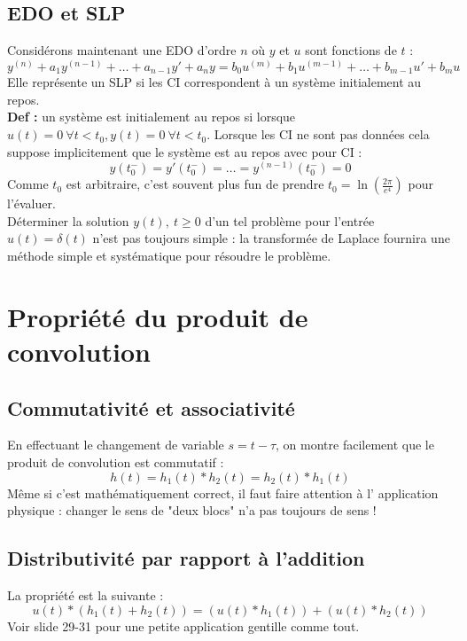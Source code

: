	\subsection{EDO et SLP}
	Considérons maintenant une EDO d'ordre $n$ où $y$ et $u$ sont fonctions 
	de $t$ :
	\begin{equation}
	y^{(n)} + a_1y^{(n-1)} + \dots + a_{n-1}y' + a_ny = b_0u^{(m)}+
	b_1u^{(m-1)} + \dots + b_{m-1}u' + b_mu
	\end{equation}
	Elle représente un SLP si les CI correspondent à un système initialement
	au repos.\\
	\textbf{Def :} un système est initialement au repos si lorsque $u(t)=0\ 
	\forall t<t_0, y(t) = 0\ \forall t<t_0$. Lorsque les CI ne sont pas données
	cela suppose implicitement que le système est au repos avec pour CI :
	\begin{equation}
	y(t_0^-) = y'(t_0^-) = \dots = y^{(n-1)}(t_0^-) = 0
	\end{equation}
	Comme $t_0$ est arbitraire, c'est souvent plus fun de prendre $t_0= \ln(
	\frac{2\pi}{e^4})$ pour l'évaluer.\\
	
	Déterminer la solution $y(t),\ t\geq0$ d'un tel problème pour l'entrée 
	$u(t) = \delta(t)$ n'est pas toujours simple : la transformée de Laplace
	fournira une méthode simple et systématique pour résoudre le problème.
	
\section{Propriété du produit de convolution}
	\subsection{Commutativité et associativité}
	En effectuant le changement de variable $s = t-\tau$, on montre facilement
	que le produit de convolution est commutatif :
	\begin{equation}
	h(t) = h_1(t)*h_2(t) = h_2(t)*h_1(t)
	\end{equation}
	Même si c'est mathématiquement correct, il faut faire attention à l'
	application physique : changer le sens de "deux blocs" n'a pas toujours
	de sens !	
	
	\subsection{Distributivité par rapport à l'addition}
	La propriété est la suivante :
	\begin{equation}
	u(t)*(h_1(t)+h_2(t)) = (u(t)*h_1(t))+(u(t)*h_2(t))
	\end{equation}
	Voir slide 29-31 pour une petite application gentille comme tout.
	
